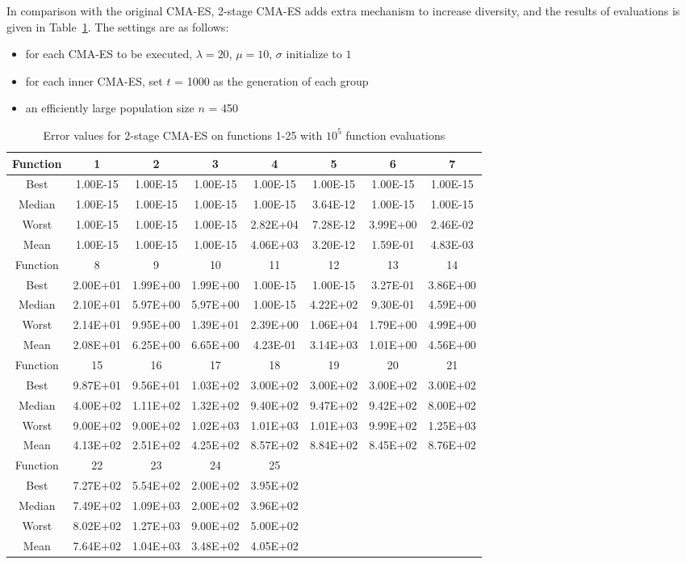 In comparison with the original CMA-ES, 2-stage CMA-ES adds extra
mechanism to increase diversity, and the results of evaluations is given
in Table~\ref{table:2layercmaes}.
The settings are as follows:
\begin{itemize}
  \item{for each CMA-ES to be executed, $\lambda = 20$,
      $\mu=10$, $\sigma$ initialize to $1$}
  \item{for each inner CMA-ES, set $t$ = 1000 as the generation of each
    group}
  \item{an efficiently large population size $n$ = 450}
  \end{itemize}

\begin{table}[h]
\footnotesize
  \centering
\begin{tabular}{@{}cccccccc@{}}
\toprule
Function&1       &2       &3       &4       &5       &6       &7     \\ \midrule
Best    &1.00E-15&1.00E-15&1.00E-15&1.00E-15&1.00E-15&1.00E-15&1.00E-15 \\
Median  &1.00E-15&1.00E-15&1.00E-15&1.00E-15&3.64E-12&1.00E-15&1.00E-15\\
Worst   &1.00E-15&1.00E-15&1.00E-15&2.82E+04&7.28E-12&3.99E+00&2.46E-02\\
Mean    &1.00E-15&1.00E-15&1.00E-15&4.06E+03&3.20E-12&1.59E-01&4.83E-03\\\midrule
Function&8       &9       &10      &11      &12      &13      &14      \\\midrule
Best    &2.00E+01&1.99E+00&1.99E+00&1.00E-15&1.00E-15&3.27E-01&3.86E+00\\
Median  &2.10E+01&5.97E+00&5.97E+00&1.00E-15&4.22E+02&9.30E-01&4.59E+00 \\
Worst   &2.14E+01&9.95E+00&1.39E+01&2.39E+00&1.06E+04&1.79E+00&4.99E+00\\
Mean    &2.08E+01&6.25E+00&6.65E+00&4.23E-01&3.14E+03&1.01E+00&4.56E+00\\\midrule
Function&15      &16      &17      &18      &19      &20      &21\\\midrule
Best    &9.87E+01&9.56E+01&1.03E+02&3.00E+02&3.00E+02&3.00E+02&3.00E+02\\
Median  &4.00E+02&1.11E+02&1.32E+02&9.40E+02&9.47E+02&9.42E+02&8.00E+02\\
Worst   &9.00E+02&9.00E+02&1.02E+03&1.01E+03&1.01E+03&9.99E+02&1.25E+03\\
Mean    &4.13E+02&2.51E+02&4.25E+02&8.57E+02&8.84E+02&8.45E+02&8.76E+02\\\midrule
Function&22      &23      &24      &25&&&\\\midrule
Best    &7.27E+02&5.54E+02&2.00E+02&3.95E+02&&&\\
Median  &7.49E+02&1.09E+03&2.00E+02&3.96E+02&&&\\
Worst   &8.02E+02&1.27E+03&9.00E+02&5.00E+02&&&\\
Mean    &7.64E+02&1.04E+03&3.48E+02&4.05E+02&&&\\\bottomrule
\end{tabular}
\caption{Error values for 2-stage CMA-ES on functions 1-25 with $10^5$ function evaluations}
\label{table:2layercmaes}
\end{table}

